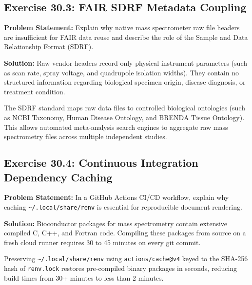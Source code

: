 \documentclass[11pt,twoside,openright]{book}
\begin{document}
\subsection*{Exercise 30.3: FAIR SDRF Metadata Coupling}
\noindent\textbf{Problem Statement:}\enspace
Explain why native mass spectrometer raw file headers are insufficient for FAIR data reuse and describe the role of the Sample and Data Relationship Format (SDRF).

\noindent\textbf{Solution:}\enspace
Raw vendor headers record only physical instrument parameters (such as scan rate, spray voltage, and quadrupole isolation widths). They contain no structured information regarding biological specimen origin, disease diagnosis, or treatment condition. 

The SDRF standard maps raw data files to controlled biological ontologies (such as NCBI Taxonomy, Human Disease Ontology, and BRENDA Tissue Ontology). This allows automated meta-analysis search engines to aggregate raw mass spectrometry files across multiple independent studies.

\subsection*{Exercise 30.4: Continuous Integration Dependency Caching}
\noindent\textbf{Problem Statement:}\enspace
In a GitHub Actions CI/CD workflow, explain why caching \texttt{\textasciitilde/.local/share/renv} is essential for reproducible document rendering.

\noindent\textbf{Solution:}\enspace
Bioconductor packages for mass spectrometry contain extensive compiled C, C++, and Fortran code. Compiling these packages from source on a fresh cloud runner requires 30 to 45 minutes on every git commit. 

Preserving \texttt{\textasciitilde/.local/share/renv} using \texttt{actions/cache@v4} keyed to the SHA-256 hash of \texttt{renv.lock} restores pre-compiled binary packages in seconds, reducing build times from 30+ minutes to less than 2 minutes.
\end{document}
